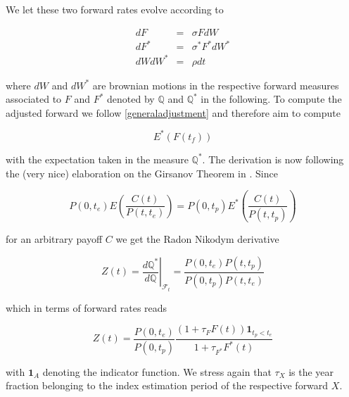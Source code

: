 \documentclass{amsart}
\theoremstyle{plain}
\numberwithin{equation}{section}
\begin{document}
We let these two forward rates evolve according to 

\begin{eqnarray}\label{model}
dF &=& \sigma F dW \\
dF^* &=& \sigma^* F^* dW^* \\
dW dW^* &=& \rho dt
\end{eqnarray}

where $dW$ and $dW^*$ are brownian motions in the respective forward measures associated to $F$ and $F^*$ denoted by $\mathbb{Q}$ and $\mathbb{Q}^*$
in the following. To compute the adjusted forward we follow \ref{generaladjustment} and therefore aim to compute

\begin{equation}
E^*( F(t_f) )
\end{equation}

with the expectation taken in the measure $\mathbb{Q}^*$. The derivation is now following the (very nice) elaboration on the Girsanov Theorem in \cite{Papa}.
Since

\begin{equation}
P(0,t_e) E\left( \frac{C(t)}{P(t,t_e)} \right) = P(0,t_p) E^*\left( \frac{C(t)}{P(t,t_p)} \right)
\end{equation}

for an arbitrary payoff $C$ we get the Radon Nikodym derivative

\begin{equation}
Z(t) = \left. \frac{d\mathbb{Q}^*}{d\mathbb{Q}} \right|_{\mathcal{F}_t} = \frac{P(0,t_e)P(t,t_p)}{ P(0,t_p)P(t,t_e)}
\end{equation}

which in terms of forward rates reads

\begin{equation}
Z(t) = \frac{P(0,t_e)}{P(0,t_p)} \frac{(1+\tau_F F(t))\textbf{1}_{t_p < t_e}}{1+\tau_{F^*} F^*(t)}
\end{equation}

with $\textbf{1}_A$ denoting the indicator function. We stress again that $\tau_X$ is the year fraction belonging to the index estimation period
of the respective forward $X$.

%
\end{document}

